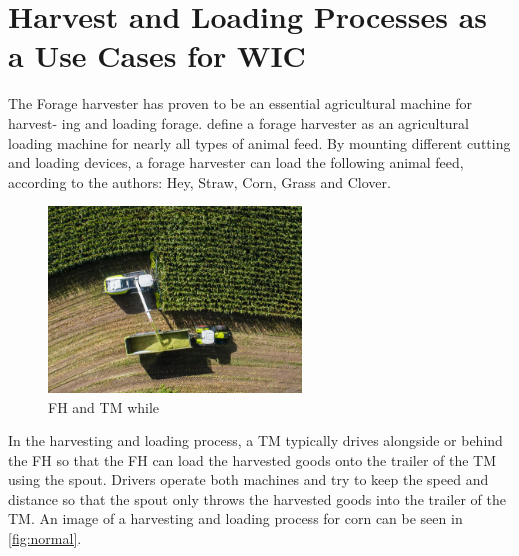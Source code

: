 \section{Harvest and Loading Processes as a Use Cases for \acl{WIC}}
The Forage harvester has proven to be an essential agricultural machine for harvest-
ing and loading forage. \textcite{seifert_feldhacksler_1962} define a forage harvester
as an agricultural loading machine for nearly all types of animal feed. By mounting different cutting and loading devices, a forage harvester can load the following animal feed, according to the authors: Hey, Straw, Corn, Grass and Clover.

\begin{figure}%
	\centering
	\includegraphics[width=0.6\textwidth]{figures/claas_harvest_side.png}
	\caption{\ac{FH} and \ac{TM} while }%
	\label{fig:normal}%
\end{figure}

In the harvesting and loading process, a \ac{TM} typically drives alongside or behind the \ac{FH} so that the \ac{FH} can load the harvested goods onto the trailer of the \ac{TM} using the spout. Drivers operate both machines and try to keep the speed and distance so that the spout only throws the harvested goods into the trailer of the TM. An image of a harvesting and loading process for corn can be seen in \autoref{fig:normal}.

